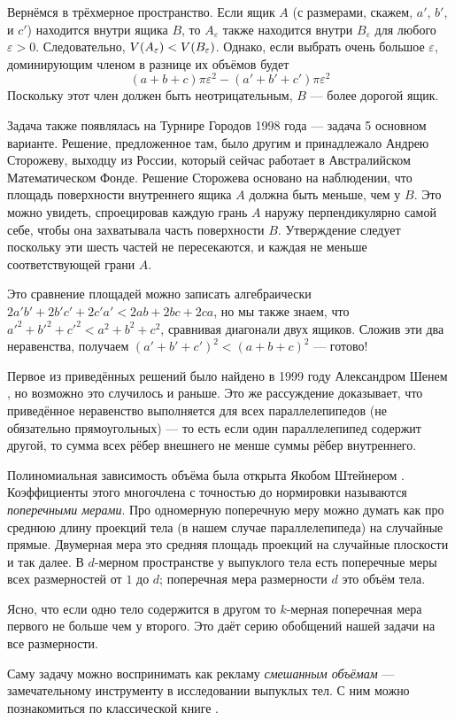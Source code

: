 Вернёмся в трёхмерное пространство.
Если ящик $A$ (с размерами, скажем, $a'$, $b'$, и $c'$) находится внутри ящика $B$, то $A_\varepsilon$ также находится внутри $B_\varepsilon$ для любого $\varepsilon > 0$.
Следовательно, $V(A_\varepsilon ) \z< V(B_\varepsilon)$.
Однако, если выбрать очень большое $\varepsilon$, доминирующим членом в разнице их объёмов будет
\[(a+b+c)\pi\varepsilon^2-(a'+b'+c')\pi\varepsilon^2\]
Поскольку этот член должен быть неотрицательным, $B$ --- более дорогой ящик.

Задача также появлялась на Турнире Городов 1998 года ---
задача 5 основном варианте.
Решение, предложенное там, было другим и принадлежало Андрею Сторожеву, выходцу из России, который сейчас работает в Австралийском Математическом Фонде.
Решение Сторожева основано на наблюдении, что площадь поверхности внутреннего ящика $A$ должна быть меньше, чем у  $B$.
Это можно увидеть, спроецировав каждую грань $A$ наружу перпендикулярно самой себе, чтобы она захватывала часть поверхности $B$.
Утверждение следует поскольку эти шесть частей не пересекаются, и каждая не меньше соответствующей грани $A$.

Это сравнение площадей можно записать алгебраически $2a'b'+2b'c'+2c'a' < 2ab+2bc+2ca$, но мы также знаем, что $a'^2+b'^2+c'^2<a^2+b^2+c^2$, сравнивая диагонали двух ящиков.
Сложив эти два неравенства, получаем 
$(a'+b'+c')^2<(a+b+c)^2$ --- готово!

\begin{addedbytheeditors}
Первое из приведённых решений было найдено в 1999 году Александром Шенем \cite{shen}, но возможно это случилось и раньше.
Это же рассуждение доказывает, что приведённое неравенство выполняется для всех параллелепипедов (не обязательно прямоугольных) --- то есть если один параллелепипед содержит другой, то сумма всех рёбер внешнего не менше суммы рёбер внутреннего.

Полиномиальная зависимость объёма была открыта Якобом Штейнером \cite{steiner}.
Коэффициенты этого многочлена с точностью до нормировки называются \emph{поперечными мерами}.
Про одномерную поперечную меру можно думать как про среднюю длину проекций тела (в нашем случае параллелепипеда) на случайные прямые.
Двумерная мера это средняя площадь проекций на случайные плоскости и так далее.
В $d$-мерном пространстве у выпуклого тела есть поперечные меры всех размерностей от $1$ до $d$;
поперечная мера размерности $d$ это объём тела.

Ясно, что если одно тело содержится в другом то $k$-мерная поперечная мера первого не больше чем у второго.
Это даёт серию обобщений нашей задачи на все размерности.

Саму задачу можно воспринимать как рекламу \emph{смешанным объёмам} --- замечательному инструменту в исследовании выпуклых тел.
С ним можно познакомиться по классической книге \cite{burago-zalgaller}.
\end{addedbytheeditors}
